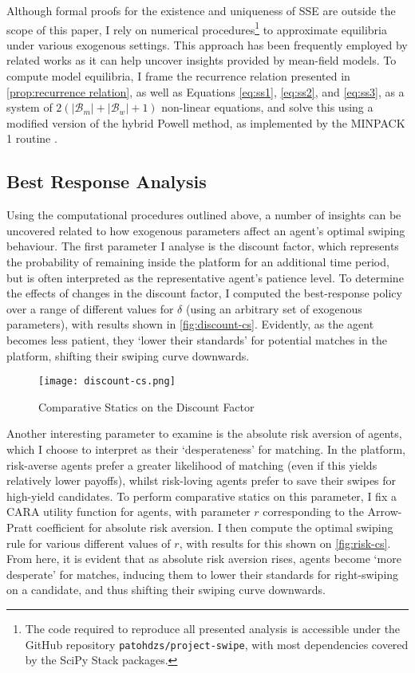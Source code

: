 Although formal proofs for the existence and uniqueness of SSE are outside the scope of this paper, I rely on numerical procedures\footnote{The code required to reproduce all presented analysis is accessible under the GitHub repository \texttt{patohdzs/project-swipe}, with most dependencies covered by the SciPy Stack packages.} to approximate equilibria under various exogenous settings. This approach has been frequently employed by related works \citep[see][]{iyer2014mean, gummadi2011optimal} as it can help uncover insights provided by mean-field models. To compute model equilibria, I frame the recurrence relation presented in \autoref{prop:recurrence relation}, as well as Equations \ref{eq:ss1}, \ref{eq:ss2}, and \ref{eq:ss3}, as a system of $2(|\mathcal{B}_m|+|\mathcal{B}_w|+1)$ non-linear equations, and solve this using a modified version of the hybrid Powell method, as implemented by the MINPACK 1 routine \citep{more1980user}.

\subsection{Best Response Analysis}\label{sec:section3.2} 
Using the computational procedures outlined above, a number of insights can be uncovered related to how exogenous parameters affect an agent's optimal swiping behaviour. The first parameter I analyse is the discount factor, which represents the probability of remaining inside the platform for an additional time period, but is often interpreted as the representative agent's patience level. To determine the effects of changes in the discount factor, I computed the best-response policy over a range of different values for $\delta$ (using an arbitrary set of exogenous parameters), with results shown in \autoref{fig:discount-cs}. Evidently, as the agent becomes less patient, they `lower their standards' for potential matches in the platform, shifting their swiping curve downwards. 

\begin{figure}[ht] 
    \centering
    \caption{Comparative Statics on the Discount Factor}
    \texttt{[image: discount-cs.png]}
    \label{fig:discount-cs}
\end{figure} 

Another interesting parameter to examine is the absolute risk aversion of agents, which I choose to interpret as their `desperateness' for matching. In the platform, risk-averse agents prefer a greater likelihood of matching (even if this yields relatively lower payoffs), whilst risk-loving agents prefer to save their swipes for high-yield candidates. To perform comparative statics on this parameter, I fix a CARA utility function for agents, with parameter $r$ corresponding to the Arrow-Pratt coefficient for absolute risk aversion. I then compute the optimal swiping rule for various different values of $r$, with results for this shown on \autoref{fig:risk-cs}. From here, it is evident that as absolute risk aversion rises, agents become `more desperate' for matches, inducing them to lower their standards for right-swiping on a candidate, and thus shifting their swiping curve downwards.

